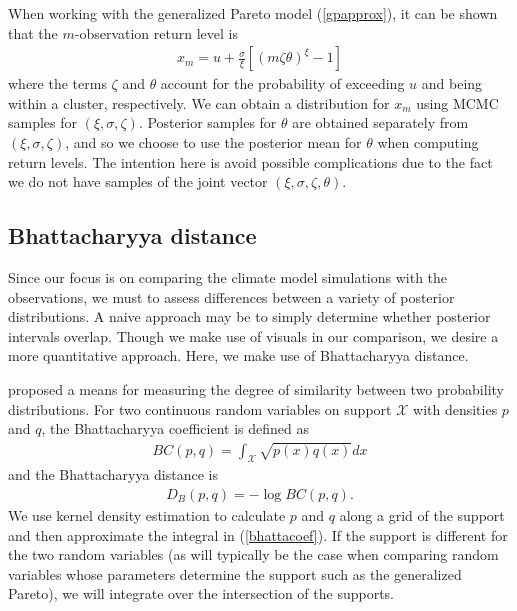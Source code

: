 When working with the generalized Pareto model (\ref{gpapprox}), it can be shown that the $m$-observation return level is
\begin{align}
x_m = u +\frac{\sigma}{\xi}\left[\left(m\zeta\theta\right)^\xi-1\right] \label{rl}
\end{align}
where the terms $\zeta$ and $\theta$ account for the probability of exceeding $u$ and being within a cluster, respectively. We can obtain a distribution for $x_m$ using MCMC samples for $(\xi, \sigma, \zeta)$. Posterior samples for $\theta$ are obtained separately from $(\xi, \sigma, \zeta)$, and so we choose to use the posterior mean for $\theta$ when computing return levels. The intention here is avoid possible complications due to the fact we do not have samples of the joint vector $(\xi, \sigma, \zeta, \theta)$.


\subsection{Bhattacharyya distance}
\label{bhatta}

Since our focus is on comparing the climate model simulations with the observations, we must to assess differences between a variety of posterior distributions. A naive approach may be to simply determine whether posterior intervals overlap. Though we make use of visuals in our comparison, we desire a more quantitative approach. Here, we make use of Bhattacharyya distance.

\cite{bhattacharyya1943measure} proposed a means for measuring the degree of similarity between two probability distributions. For two continuous random variables on support $\mathcal{X}$ with densities $p$ and $q$, the Bhattacharyya coefficient is defined as
\begin{align}
BC(p,q)=\int_\mathcal{X} \sqrt{p(x)q(x)} dx \label{bhattacoef}
\end{align}
and the Bhattacharyya distance is 
\begin{align}
D_B(p,q)=-\log BC(p,q).
\end{align}
We use kernel density estimation to calculate $p$ and $q$ along a grid of the support and then approximate the integral in (\ref{bhattacoef}). If the support is different for the two random variables (as will typically be the case when comparing random variables whose parameters determine the support such as the generalized Pareto), we will integrate over the intersection of the supports.

